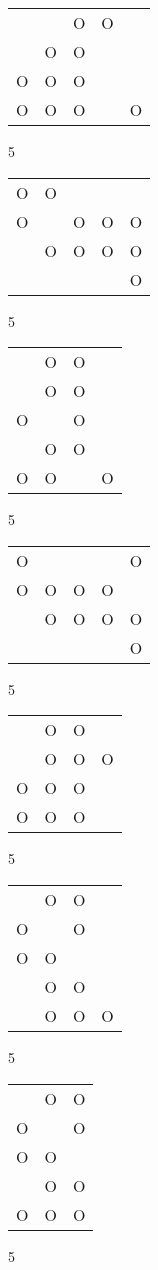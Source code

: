\begin{tabular}{|m{0.2cm}m{0.2cm}m{0.2cm}m{0.2cm}m{0.2cm}|}\hline
 & &O&O& \\
 &O&O& & \\
O&O&O& & \\
O&O&O& &O\\
\hline\end{tabular}5
\begin{tabular}{|m{0.2cm}m{0.2cm}m{0.2cm}m{0.2cm}m{0.2cm}|}\hline
O&O& & & \\
O& &O&O&O\\
 &O&O&O&O\\
 & & & &O\\
\hline\end{tabular}5
\begin{tabular}{|m{0.2cm}m{0.2cm}m{0.2cm}m{0.2cm}|}\hline
 &O&O& \\
 &O&O& \\
O& &O& \\
 &O&O& \\
O&O& &O\\
\hline\end{tabular}5
\begin{tabular}{|m{0.2cm}m{0.2cm}m{0.2cm}m{0.2cm}m{0.2cm}|}\hline
O& & & &O\\
O&O&O&O& \\
 &O&O&O&O\\
 & & & &O\\
\hline\end{tabular}5
\begin{tabular}{|m{0.2cm}m{0.2cm}m{0.2cm}m{0.2cm}|}\hline
 &O&O& \\
 &O&O&O\\
O&O&O& \\
O&O&O& \\
\hline\end{tabular}5
\begin{tabular}{|m{0.2cm}m{0.2cm}m{0.2cm}m{0.2cm}|}\hline
 &O&O& \\
O& &O& \\
O&O& & \\
 &O&O& \\
 &O&O&O\\
\hline\end{tabular}5
\begin{tabular}{|m{0.2cm}m{0.2cm}m{0.2cm}|}\hline
 &O&O\\
O& &O\\
O&O& \\
 &O&O\\
O&O&O\\
\hline\end{tabular}5
